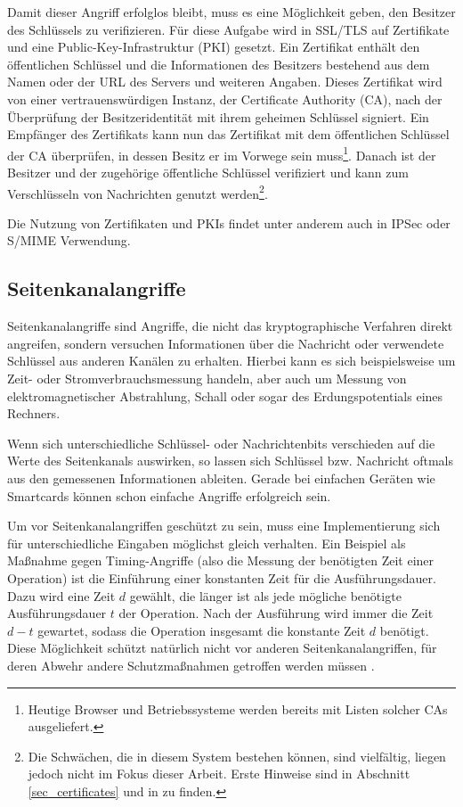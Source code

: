 Damit dieser Angriff erfolglos bleibt, muss es eine Möglichkeit geben, den Besitzer des Schlüssels zu verifizieren. Für diese Aufgabe wird in SSL/TLS auf Zertifikate und eine Public-Key-Infrastruktur (PKI) gesetzt. Ein Zertifikat enthält den öffentlichen Schlüssel und die Informationen des Besitzers bestehend aus dem Namen oder der URL des Servers und weiteren Angaben. Dieses Zertifikat wird von einer vertrauenswürdigen Instanz, der Certificate Authority (CA), nach der Überprüfung der Besitzeridentität mit ihrem geheimen Schlüssel signiert. Ein Empfänger des Zertifikats kann nun das Zertifikat mit dem öffentlichen Schlüssel der CA überprüfen, in dessen Besitz er im Vorwege sein muss\footnote{
	Heutige Browser und Betriebssysteme werden bereits mit Listen solcher CAs ausgeliefert.
}. Danach ist der Besitzer und der zugehörige öffentliche Schlüssel verifiziert und kann zum Verschlüsseln von Nachrichten genutzt werden\footnote{
	Die Schwächen, die in diesem System bestehen können, sind vielfältig, liegen jedoch nicht im Fokus dieser Arbeit. Erste Hinweise sind in Abschnitt \ref{sec_certificates} und in \cite{ferguson10} zu finden.
}. 

Die Nutzung von Zertifikaten und PKIs findet unter anderem auch in IPSec oder S/MIME Verwendung. 

\subsection{Seitenkanalangriffe}
Seitenkanalangriffe sind Angriffe, die nicht das kryptographische Verfahren direkt angreifen, sondern versuchen Informationen über die Nachricht oder verwendete Schlüssel aus anderen Kanälen zu erhalten. Hierbei kann es sich beispielsweise um Zeit- oder Stromverbrauchsmessung handeln, aber auch um Messung von elektromagnetischer Abstrahlung, Schall oder sogar des Erdungspotentials eines Rechners. 

Wenn sich unterschiedliche Schlüssel- oder Nachrichtenbits verschieden auf die Werte des Seitenkanals auswirken, so lassen sich Schlüssel bzw. Nachricht oftmals aus den gemessenen Informationen ableiten. Gerade bei einfachen Geräten wie Smartcards können schon einfache Angriffe erfolgreich sein.

Um vor Seitenkanalangriffen geschützt zu sein, muss eine Implementierung sich für unterschiedliche Eingaben möglichst gleich verhalten. Ein Beispiel als Maßnahme gegen Timing-Angriffe (also die Messung der benötigten Zeit einer Operation) ist die Einführung einer konstanten Zeit für die Ausführungsdauer. Dazu wird eine Zeit \(d\) gewählt, die länger ist als jede mögliche benötigte Ausführungsdauer \(t\) der Operation. Nach der Ausführung wird immer die Zeit \(d-t\) gewartet, sodass die Operation insgesamt die konstante Zeit \(d\) benötigt. Diese Möglichkeit schützt natürlich nicht vor anderen Seitenkanalangriffen, für deren Abwehr andere Schutzmaßnahmen getroffen werden müssen \cite{ferguson10}.

